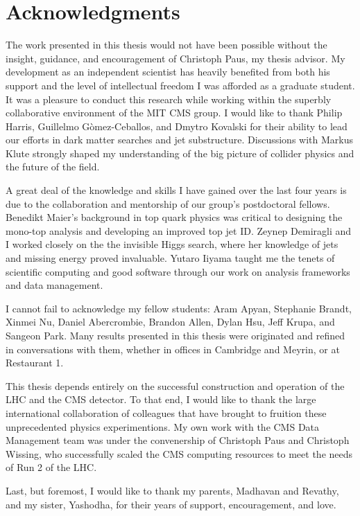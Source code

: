 % 

\cleardoublepage

\section*{Acknowledgments}

The work presented in this thesis would not have been possible without the insight, guidance, and encouragement of Christoph Paus, my thesis advisor. 
My development as an independent scientist has heavily benefited from both his support and the level of intellectual freedom I was afforded as a graduate student. 
It was a pleasure to conduct this research while working within the superbly collaborative environment of the MIT CMS group. 
I would like to thank Philip Harris, Guillelmo G\`omez-Ceballos, and Dmytro Kovalski for their ability to lead our efforts in dark matter searches and jet substructure.
Discussions with Markus Klute strongly shaped my understanding of the big picture of collider physics and the future of the field. 

A great deal of the knowledge and skills I have gained over the last four years is due to the collaboration and mentorship of our group's postdoctoral fellows.
Benedikt Maier's background in top quark physics was critical to designing the mono-top analysis and developing an improved top jet ID.
Zeynep Demiragli and I worked closely on the the invisible Higgs search, where her knowledge of jets and missing energy proved invaluable.
Yutaro Iiyama taught me the tenets of scientific computing and good software through our work on analysis frameworks and data management.

I cannot fail to acknowledge my fellow students: Aram Apyan, Stephanie Brandt, Xinmei Nu, Daniel Abercrombie, Brandon Allen, Dylan Hsu, Jeff Krupa, and Sangeon Park.
Many results presented in this thesis were originated and refined in conversations with them, whether in offices in Cambridge and Meyrin, or at Restaurant 1. 
 
This thesis depends entirely on the successful construction and operation of the LHC and the CMS detector.
To that end, I would like to thank the large international collaboration of colleagues that have brought to fruition these unprecedented physics experimentions.
My own work with the CMS Data Management team was under the convenership of Christoph Paus and Christoph Wissing, who successfully scaled the CMS computing resources to meet the needs of Run 2 of the LHC.

Last, but foremost, I would like to thank my parents, Madhavan and Revathy, and my sister, Yashodha, for their years of support, encouragement, and love. 


